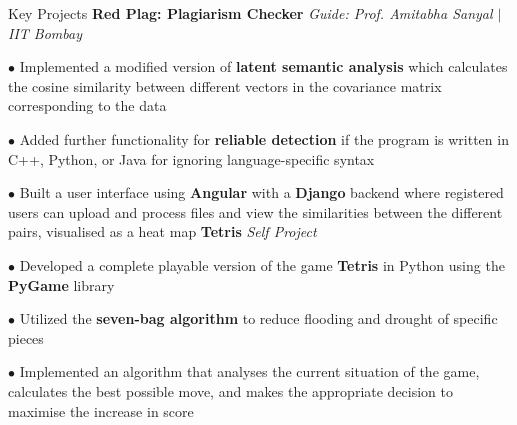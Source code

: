 \begin{rubric}{Key Projects}
    \entry*[2020] \textbf{Red Plag: Plagiarism Checker} \hfill \emph{Guide: Prof. Amitabha Sanyal $\mid$ IIT Bombay}
	    
	    $\bullet$ Implemented a modified version of \textbf{latent semantic analysis} which calculates the cosine similarity between different vectors in the covariance matrix corresponding to the data
        
        $\bullet$ Added further functionality for \textbf{reliable detection} if the program is written in C++, Python, or Java for ignoring language-specific syntax

        $\bullet$ Built a user interface using \textbf{Angular} with a \textbf{Django} backend where registered users can upload and process files and view the similarities between the different pairs, visualised as a heat map
	\entry*[2020\phantom{}] \textbf{Tetris} \hfill \emph{Self Project}

        $\bullet$ Developed a complete playable version of the game \textbf{Tetris} in Python using the \textbf{PyGame} library
        
        $\bullet$ Utilized the \textbf{seven-bag algorithm} to reduce flooding and drought of specific pieces
        
        $\bullet$ Implemented an algorithm that analyses the current situation of the game, calculates the best possible move, and makes the appropriate decision to maximise the increase in score
\end{rubric}